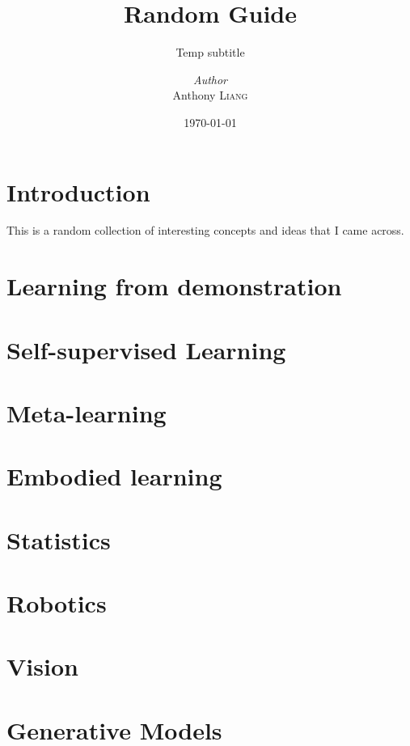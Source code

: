 \documentclass[a4paper, 12pt]{report}
\title{Random Guide}
\subtitle{Temp subtitle}
\author{\textit{Author}\\Anthony \textsc{Liang}}
\date{\today}
\begin{document}
    \maketitle
    \romantableofcontents

    \chapter{Introduction}

    This is a random collection of interesting concepts and ideas that I came across.

    \chapter{Learning from demonstration}

    \chapter{Self-supervised Learning}

    \chapter{Meta-learning}

    \chapter{Embodied learning}

    \chapter{Statistics}

    

    \chapter{Robotics}

    \chapter{Vision}

    

    \chapter{Generative Models}

    
\end{document}
